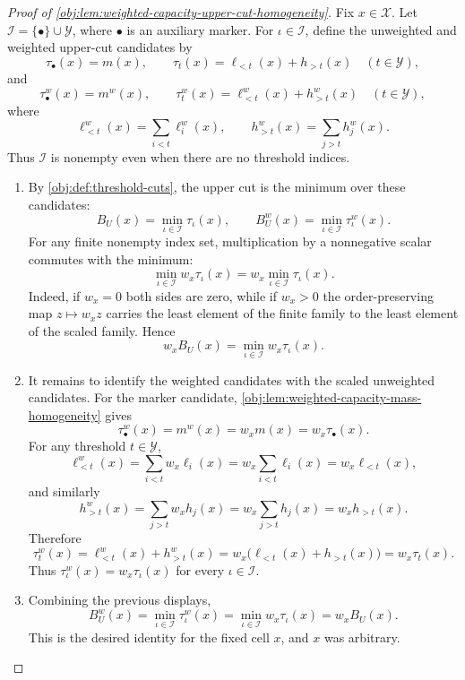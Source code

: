 \begin{proof}[Proof of \cref{obj:lem:weighted-capacity-upper-cut-homogeneity}]
Fix \(x\in\mathcal X\).  Let \(\mathcal I=\{\bullet\}\cup\mathcal Y\), where \(\bullet\) is an auxiliary marker.  For \(\iota\in\mathcal I\), define the unweighted and weighted upper-cut candidates by
\[
\tau_{\bullet}(x)=m(x),
\qquad
\tau_t(x)=\ell_{<t}(x)+h_{>t}(x)\quad(t\in\mathcal Y),
\]
and
\[
\tau^w_{\bullet}(x)=m^w(x),
\qquad
\tau^w_t(x)=\ell^w_{<t}(x)+h^w_{>t}(x)\quad(t\in\mathcal Y),
\]
where
\[
\ell^w_{<t}(x)=\sum_{i<t}\ell^w_i(x),
\qquad
h^w_{>t}(x)=\sum_{j>t}h^w_j(x).
\]
Thus \(\mathcal I\) is nonempty even when there are no threshold indices.

\begin{enumerate}
\item By \cref{obj:def:threshold-cuts}, the upper cut is the minimum over these candidates:
\[
B_U(x)=\min_{\iota\in\mathcal I}\tau_{\iota}(x),
\qquad
B_U^w(x)=\min_{\iota\in\mathcal I}\tau^w_{\iota}(x).
\]
For any finite nonempty index set, multiplication by a nonnegative scalar commutes with the minimum:
\[
\min_{\iota\in\mathcal I} w_x\tau_{\iota}(x)
=
w_x\min_{\iota\in\mathcal I}\tau_{\iota}(x).
\]
Indeed, if \(w_x=0\) both sides are zero, while if \(w_x>0\) the order-preserving map \(z\mapsto w_xz\) carries the least element of the finite family to the least element of the scaled family.  Hence
\[
w_x B_U(x)
=
\min_{\iota\in\mathcal I} w_x\tau_{\iota}(x).
\]

\item It remains to identify the weighted candidates with the scaled unweighted candidates.  For the marker candidate, \cref{obj:lem:weighted-capacity-mass-homogeneity} gives
\[
\tau^w_{\bullet}(x)=m^w(x)=w_xm(x)=w_x\tau_{\bullet}(x).
\]
For any threshold \(t\in\mathcal Y\),
\[
\ell^w_{<t}(x)
=
\sum_{i<t} w_x\ell_i(x)
=
w_x\sum_{i<t}\ell_i(x)
=
w_x\ell_{<t}(x),
\]
and similarly
\[
h^w_{>t}(x)
=
\sum_{j>t} w_xh_j(x)
=
w_x\sum_{j>t}h_j(x)
=
w_xh_{>t}(x).
\]
Therefore
\[
\tau^w_t(x)
=
\ell^w_{<t}(x)+h^w_{>t}(x)
=
w_x\bigl(\ell_{<t}(x)+h_{>t}(x)\bigr)
=
w_x\tau_t(x).
\]
Thus \(\tau^w_{\iota}(x)=w_x\tau_{\iota}(x)\) for every \(\iota\in\mathcal I\).

\item Combining the previous displays,
\[
B_U^w(x)
=
\min_{\iota\in\mathcal I}\tau^w_{\iota}(x)
=
\min_{\iota\in\mathcal I}w_x\tau_{\iota}(x)
=
w_xB_U(x).
\]
This is the desired identity for the fixed cell \(x\), and \(x\) was arbitrary.
\end{enumerate}
\end{proof}
